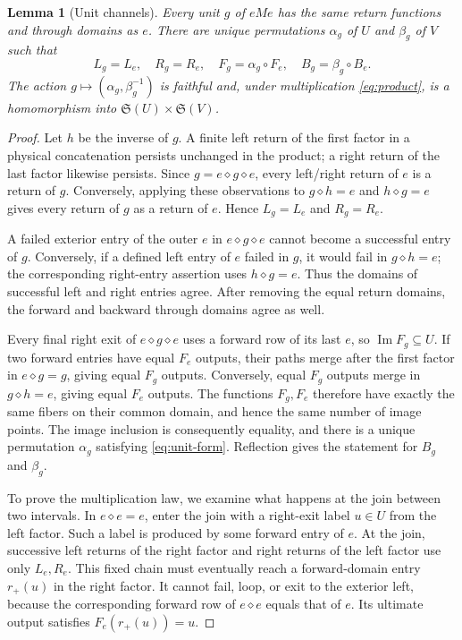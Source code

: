 \documentclass[11pt,a4paper]{article}
\newtheorem{lemma}[theorem]{Lemma}
\theoremstyle{definition}
\theoremstyle{remark}
\newcommand{\Sym}{\mathfrak S}
\newcommand{\im}{\operatorname{Im}}
\begin{document}
\begin{lemma}[Unit channels]\label{lem:unit-channels}
Every unit $g$ of $eMe$ has the same return functions and through
domains as $e$. There are unique permutations $\alpha_g$ of $U$
and $\beta_g$ of $V$ such that
\begin{equation}\label{eq:unit-form}
 L_g=L_e,\quad R_g=R_e,\quad
 F_g=\alpha_g\circ F_e,\quad B_g=\beta_g\circ B_e.
\end{equation}
The action $g\mapsto(\alpha_g,\beta_g^{-1})$ is faithful and,
under multiplication \eqref{eq:product}, is a homomorphism into
$\Sym(U)\times\Sym(V)$.
\end{lemma}
\begin{proof}
Let $h$ be the inverse of $g$. A finite left return of the first
factor in a physical concatenation persists unchanged in the product;
a right return of the last factor likewise persists. Since
$g=e\diamond g\diamond e$, every left/right return of $e$ is a
return of $g$. Conversely, applying these observations to
$g\diamond h=e$ and $h\diamond g=e$ gives every return of $g$
as a return of $e$. Hence $L_g=L_e$ and $R_g=R_e$.

A failed exterior entry of the outer $e$ in $e\diamond g\diamond e$
cannot become a successful entry of $g$. Conversely, if a defined
left entry of $e$ failed in $g$, it would fail in $g\diamond h=e$;
the corresponding right-entry assertion uses $h\diamond g=e$.
Thus the domains of successful left and right entries agree. After
removing the equal return domains, the forward and backward through
domains agree as well.

Every final right exit of $e\diamond g\diamond e$ uses a forward
row of its last $e$, so $\im F_g\subseteq U$. If two forward
entries have equal $F_e$ outputs, their paths merge after the first
factor in $e\diamond g=g$, giving equal $F_g$ outputs. Conversely,
equal $F_g$ outputs merge in $g\diamond h=e$, giving equal $F_e$
outputs. The functions $F_g,F_e$ therefore have exactly the same
fibers on their common domain, and hence the same number of image
points. The image inclusion is consequently equality, and there
is a unique permutation $\alpha_g$ satisfying \eqref{eq:unit-form}. Reflection gives
the statement for $B_g$ and $\beta_g$.

To prove the multiplication law, we examine what happens at the
join between two intervals. In $e\diamond e=e$, enter the
join with a right-exit label $u\in U$ from the left factor. Such
a label is produced by some forward entry of $e$. At the join,
successive left returns of the right factor and right returns of
the left factor use only $L_e,R_e$. This fixed chain must eventually
reach a forward-domain entry $r_+(u)$ in the right factor. It cannot
fail, loop, or exit to the exterior left, because the corresponding
forward row of $e\diamond e$ equals that of $e$. Its ultimate
output satisfies $F_e(r_+(u))=u$.


\end{proof}
\end{document}
